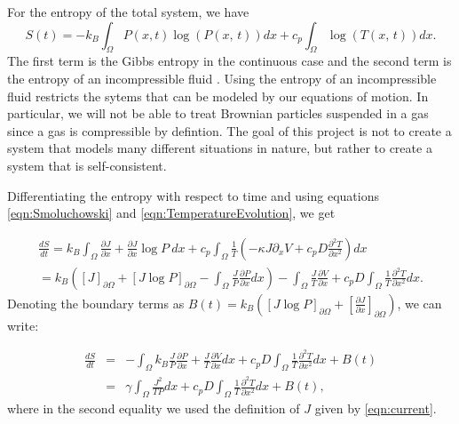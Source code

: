 For the entropy of the total system, we have \cite{Streater1997a}
\begin{equation}
S(t) = -k_B \int_{\Omega} P(x, t) \log(P(x, \, t)) dx + c_p \int_{\Omega} \log(T(x, \, t)) dx.
\end{equation}
The first term is the Gibbs entropy in the continuous case \cite{Jaynes1965} and the second term is the entropy of an incompressible fluid \cite{CengelBoles1994}. Using the entropy of an incompressible fluid restricts the sytems that can be modeled by our equations of motion. In particular, we will not be able to treat Brownian particles suspended in a gas since a gas is compressible by defintion. The goal of this project is not to create a system that models many different situations in nature, but rather to create a system that is self-consistent.

Differentiating the entropy with respect to time and using equations \ref{eqn:Smoluchowski} and \ref{eqn:TemperatureEvolution}, we get

\begin{align}
\frac{d S}{d t} =  k_B \int_{\Omega} \frac{\partial J}{\partial x} + \frac{\partial J}{\partial x} \log P \ dx + c_p \int_{\Omega} \frac{1}{T} \left(-\kappa J \partial_x V + c_p D \frac{\partial^2 T}{\partial x^2} \right) dx \\
                     = k_B \left ( [J]_{\partial \Omega} + [J \log P]_{\partial \Omega} - \int_{\Omega} \frac{J}{P} \frac{\partial P}{\partial x} dx \right) - \int_{\Omega} \frac{J}{T} \frac{\partial V}{\partial x} + c_p D \int_{\Omega} \frac{1}{T} \frac{\partial^2 T}{\partial x^2} dx.
\end{align}
Denoting the boundary terms as $B(t) = k_B( [J \log P]_{\partial \Omega} + \left[\frac{\partial J}{\partial x} \right]_{\partial \Omega} ) $, we can write:

\begin{eqnarray}
\frac{d S}{d t} & = & - \int_{\Omega} k_B \frac{J}{P} \frac{\partial P}{\partial x} + \frac{J}{T} \frac{\partial V}{\partial x} dx +  c_p D \int_{\Omega} \frac{1}{T} \frac{\partial^2 T}{\partial x^2} dx + B(t) \\
                    & = & \gamma \int_{\Omega} \frac{J^2}{T P} dx + c_p D \int_{\Omega} \frac{1}{T} \frac{\partial^2 T}{\partial x^2} dx + B(t), \label{eqn:entropyGen}
\end{eqnarray}
where in the second equality we used the definition of $J$ given by \ref{eqn:current}.

